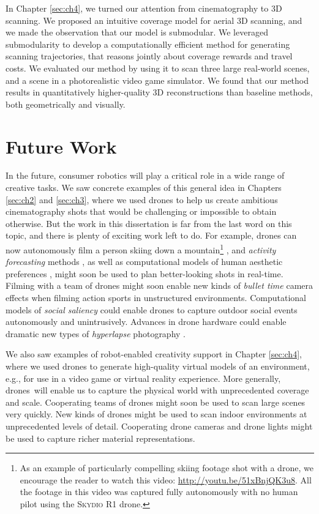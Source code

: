 In Chapter \ref{sec:ch4}, we turned our attention from cinematography to 3D scanning.
We proposed an intuitive coverage model for aerial 3D scanning, and we made the observation that our model is submodular.
We leveraged submodularity to develop a computationally efficient method for generating scanning trajectories, that reasons jointly about coverage rewards and travel costs.
We evaluated our method by using it to scan three large real-world scenes, and a scene in a photorealistic video game simulator.
We found that our method results in quantitatively higher-quality 3D reconstructions than baseline methods, both geometrically and visually.

\section{Future Work}

In the future, consumer robotics will play a critical role in a wide range of creative tasks. 
We saw concrete examples of this general idea in Chapters \ref{sec:ch2} and \ref{sec:ch3}, where we used drones to help us create ambitious cinematography shots that would be challenging or impossible to obtain otherwise.
But the work in this dissertation is far from the last word on this topic, and there is plenty of exciting work left to do.
For example, drones can now autonomously film a person skiing down a mountain\footnote{As an example of particularly compelling skiing footage shot with a drone, we encourage the reader to watch this video: \url{http://youtu.be/51xBnjQK3u8}. All the footage in this video was captured fully autonomously with no human pilot using the \textsc{Skydio R1} drone.} \cite{skydio:2018}, and \emph{activity forecasting} methods \cite{kitani:2012}, as well as computational models of human aesthetic preferences \cite{secord:2011}, might soon be used to plan better-looking shots in real-time.
Filming with a team of drones \cite{nageli:2017} might soon enable new kinds of \emph{bullet time} camera effects \cite{zitnick:2004} when filming action sports in unstructured environments. Computational models of \emph{social saliency} \cite{park:2012,arev:2014} could enable drones to capture outdoor social events autonomously and unintrusively.
Advances in drone hardware could enable dramatic new types of \emph{hyperlapse} photography \cite{kopf:2014}.

We also saw examples of robot-enabled creativity support in Chapter \ref{sec:ch4}, where we used drones to generate high-quality virtual models of an environment, e.g., for use in a video game or virtual reality experience.
More generally, drones\ will enable us to capture the physical world with unprecedented coverage and scale.
Cooperating teams of drones might soon be used to scan large scenes very quickly.
New kinds of drones might be used to scan indoor environments at unprecedented levels of detail. Cooperating drone cameras and drone lights might be used to capture richer material representations.

